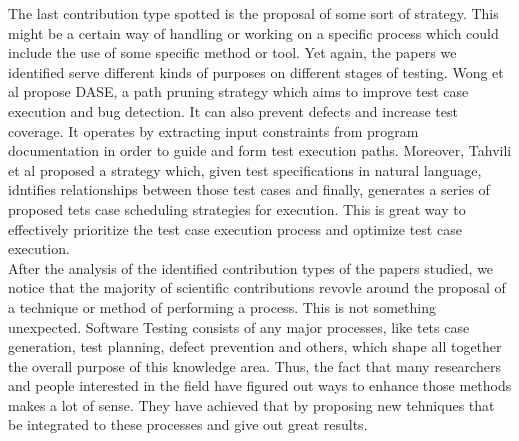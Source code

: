 The last contribution type spotted is the proposal of some sort of strategy. This might be a certain way of handling or working on a specific process which 
could include the use of some specific method or tool. Yet again, the papers we identified serve different kinds of purposes on different stages 
of testing. Wong et al \cite{wong2015dase} propose DASE, a path pruning strategy which aims to improve test case execution and bug detection. It can also prevent 
defects and increase test coverage. It operates by extracting input constraints from program documentation in order to guide and form test execution paths. 
Moreover, Tahvili et al \cite{10.1145/3195538.3195540} proposed a strategy which, given test specifications in natural language, idntifies relationships 
between those test cases and finally, generates a series of proposed tets case scheduling strategies for execution. This is great way to effectively 
prioritize the test case execution process and optimize test case execution. \\

After the analysis of the identified contribution types of the papers studied, we notice that the majority of scientific contributions revovle around 
the proposal of a technique or method of performing a process. This is not something unexpected. Software Testing consists of any major processes, like 
tets case generation, test planning, defect prevention and others, which shape all together the overall purpose of this knowledge area. Thus, the fact that 
many researchers and people interested in the field have figured out ways to enhance those methods makes a lot of sense. They have achieved 
that by proposing new tehniques that be integrated to these processes and give out great results.
